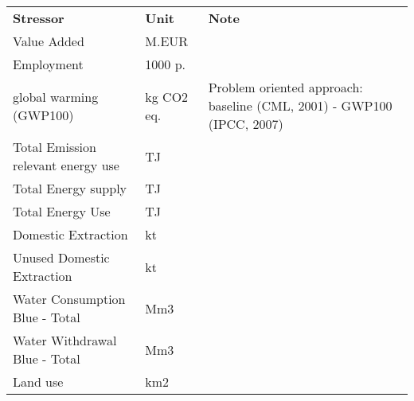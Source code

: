 \begin{table}
\label{tab:cc_stressors}
\begin{tabular}{ l l l }
\textbf{Stressor}                                                                                    & \textbf{Unit} & \textbf{Note}\\
Value Added                                                                                          & M.EUR          &                                                  \\
Employment                                                                                           & 1000 p.        &                                                  \\
global warming (GWP100)                                                                              & kg CO2 eq.     & Problem oriented approach: baseline (CML, 2001) - GWP100 (IPCC, 2007)\\
Total Emission relevant energy use                                                                   & TJ             &                                                  \\
Total Energy supply                                                                                  & TJ             &                                                  \\
Total Energy Use                                                                                     & TJ             &                                                  \\
Domestic Extraction                                                                                  & kt             &                                                  \\
Unused Domestic Extraction                                                                           & kt             &                                                  \\
Water Consumption Blue - Total                                                                       & Mm3            &                                                  \\
Water Withdrawal Blue - Total                                                                        & Mm3            &                                                  \\
Land use                                                                                             & km2            &                                                  \\

\end{tabular}
\end{table}
